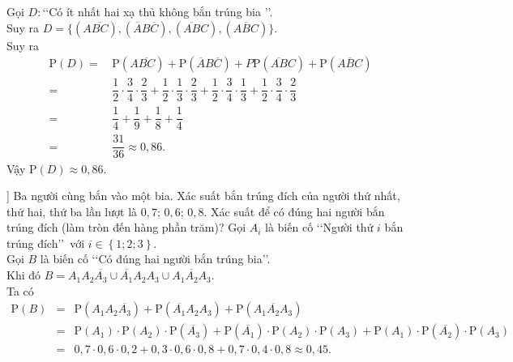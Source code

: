 \begin{bt}
{\begin{center}
	\end{center}
		Gọi $D:$\lq\lq Có ít nhất hai xạ thủ không bắn trúng bia \rq\rq.\\
		Suy ra $D=\{(A\overline{BC}), (\overline{A}B\overline{C}), (\overline{AB}C), (\overline{ABC})\}$.\\
		Suy ra 
		\begin{align*}
			\mathrm{P}(D)=&\, \mathrm{P}(A\overline{BC})+\mathrm{P}(\overline{A}B\overline{C})+P\mathrm{P}(\overline{AB}C)+\mathrm{P}(\overline{ABC})\\
			=&\, \dfrac{1}{2}\cdot\dfrac{3}{4}\cdot\dfrac{2}{3}+\dfrac{1}{2}\cdot\dfrac{1}{3}\cdot\dfrac{2}{3}+\dfrac{1}{2}\cdot\dfrac{3}{4}\cdot\dfrac{1}{3}+\dfrac{1}{2}\cdot\dfrac{3}{4}\cdot\dfrac{2}{3}\\
			=&\, \dfrac{1}{4}+\dfrac{1}{9}+\dfrac{1}{8}+\dfrac{1}{4}\\
			=&\, \dfrac{31}{36}\approx 0{,}86.
		\end{align*}
		Vậy $\mathrm{P}(D)\approx 0{,}86$.
	}
\end{bt}

\begin{bt}%
]%
Ba người cùng bắn vào một bia. Xác suất bắn trúng đích của người thứ nhất, thứ hai, thứ ba lần lượt là $0{,}7$; $0{,}6$; $0{,}8$. Xác suất để có đúng hai người bắn trúng đích (làm tròn đến hàng phần trăm)?
\loigiai
{
Gọi $A_i$ là biến cố \lq\lq Người thứ $i$ bắn trúng đích\rq\rq\, với $i \in \left\{1;2;3\right\}$.\\
Gọi $B$ là biến cố \lq\lq Có đúng hai người bắn trúng bia\rq\rq.\\
Khi đó $B=A_1A_2\overline{A_3}\cup \overline{A_1}A_2A_3\cup A_1\overline{A_2}A_3$.\\
Ta có 
\begin{eqnarray*}
\mathrm{P} \left(B \right) &=& \mathrm{P} \left(A_1A_2\overline{A_3} \right)+\mathrm{P} \left(\overline{A_1}A_2A_3 \right)+\mathrm{P} \left(A_1\overline{A_2}A_3 \right) \\ 
& = & \mathrm{P} \left(A_1 \right) \cdot \mathrm{P} \left(A_2 \right)\cdot \mathrm{P} \left(\overline{A_3} \right)+\mathrm{P} \left(\overline{A_1} \right)\cdot \mathrm{P} \left(A_2 \right)\cdot \mathrm{P} \left(A_3 \right)+\mathrm{P} \left(A_1 \right)\cdot \mathrm{P} \left(\overline{A_2} \right) \cdot \mathrm{P} \left(A_3 \right) \\ 
& = & 0,7 \cdot 0,6 \cdot 0,2+0,3 \cdot 0,6 \cdot 0,8+0,7 \cdot 0,4 \cdot 0,8 \approx 0,45.
\end{eqnarray*}
}
\end{bt}


